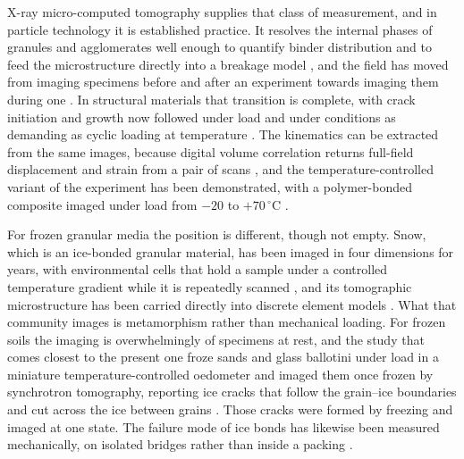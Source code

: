 \documentclass[preprint,12pt,numbers]{elsarticle}
\begin{document}
  X-ray micro-computed tomography supplies that class of measurement, and in
  particle technology it is established practice.  It resolves the internal
  phases of granules and agglomerates well enough to quantify binder
  distribution \cite{Dale2014} and to feed the microstructure directly into a
  breakage model \cite{Dosta2016}, and the field has moved from imaging
  specimens before and after an experiment towards imaging them during one
  \cite{Leissner2019}.  In structural materials that transition is complete,
  with crack initiation and growth now followed under load
  \cite{Withers2015, Wu2017} and under conditions as demanding as cyclic
  loading at temperature \cite{Qian2023}.  The kinematics can be extracted from
  the same images, because digital volume correlation returns full-field
  displacement and strain from a pair of scans \cite{Xu2018, Stamati2020}, and
  the temperature-controlled variant of the experiment has been demonstrated,
  with a polymer-bonded composite imaged under load from $-20$ to
  $+70\,^\circ$C \cite{Yuan2018}.

  For frozen granular media the position is different, though not empty.  Snow,
  which is an ice-bonded granular material, has been imaged in four dimensions
  for years, with environmental cells that hold a sample under a controlled
  temperature gradient while it is repeatedly scanned \cite{Pinzer2012}, and
  its tomographic microstructure has been carried directly into discrete
  element models \cite{Hagenmuller2015}.  What that community images is
  metamorphism rather than mechanical loading.  For frozen soils the imaging is
  overwhelmingly of specimens at rest, and the study that comes closest to the
  present one froze sands and glass ballotini under load in a miniature
  temperature-controlled oedometer and imaged them once frozen by synchrotron
  tomography, reporting ice cracks that follow the grain--ice boundaries and
  cut across the ice between grains \cite{NiBhreasail2012}.  Those cracks were
  formed by freezing and imaged at one state.  The failure mode of ice bonds
  has likewise been measured mechanically, on isolated bridges rather than
  inside a packing \cite{Kirsch2011}.
\end{document}
